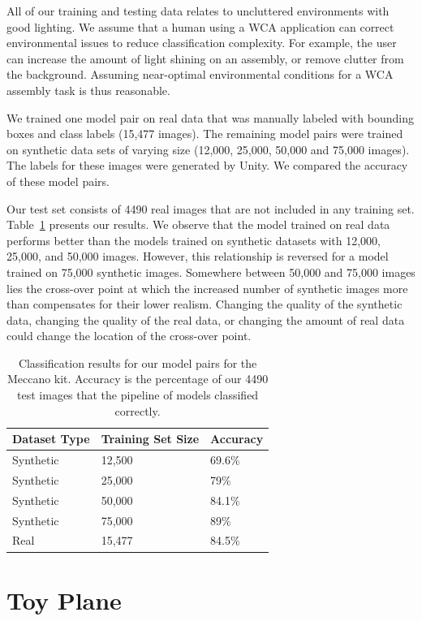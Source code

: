 All of our training and testing data relates to
uncluttered environments with good lighting.
We assume that a human
using a WCA application can correct environmental issues to reduce
classification complexity.  For example, the user can increase the
amount of light shining on an assembly, or remove clutter from the
background.
Assuming near-optimal environmental conditions for a WCA assembly
task is thus reasonable.

We trained one model pair on real data that was manually labeled with
bounding boxes and class labels (15,477 images).
The remaining model pairs were trained on synthetic data sets of varying size
(12,000, 25,000, 50,000 and 75,000 images).
The labels for these images were generated by Unity.
We compared the accuracy of these model pairs.

Our test set consists of 4490 real images that are not included in any
training set.  Table~\ref{tab:meccano_accuracy} presents our results.  We
observe that the model trained on real data performs better than the
models trained on synthetic datasets with 12,000, 25,000, and 50,000
images.  However, this relationship is reversed for a model trained on
75,000 synthetic images.
Somewhere between 50,000 and 75,000 images
lies the cross-over point at which the increased number of synthetic
images more than compensates for their lower realism.
Changing the quality of the synthetic data, changing the quality of the real
data, or changing the amount of real data could change the location of the
cross-over point.

\begin{table}
\begin{tabular}{|l||l|l|}
\hline
  Dataset Type & Training Set Size & Accuracy\\
  \hline
  \hline
  Synthetic & 12,500 & 69.6\%\\
  Synthetic & 25,000 & 79\%\\
  Synthetic & 50,000 & 84.1\%\\
  Synthetic & 75,000 & 89\%\\
  \hline
  Real & 15,477 & 84.5\%\\
\hline
\end{tabular}
  \caption{
    Classification results for our model pairs for the Meccano kit.
    Accuracy is the percentage of our 4490 test images that the pipeline of
    models classified correctly.
  }\label{tab:meccano_accuracy}
\end{table}

\section{Toy Plane}

